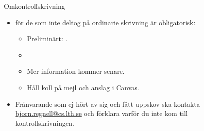 \begin{Slide}{Omkontrollskrivning}
  \begin{itemize}
    \item {} för de som inte deltog på ordinarie skrivning är obligatorisk:
    \begin{itemize}
      \item Preliminärt: . 
      \item {} 
      \item Mer information kommer senare. %
      \item Håll koll på mejl och anslag i Canvas.
    \end{itemize}
    \item Frånvarande som ej hört av sig och fått uppskov ska  kontakta \url{bjorn.regnell@cs.lth.se} och förklara varför du inte kom till kontrollskrivningen.
  \end{itemize}
\end{Slide}

    
